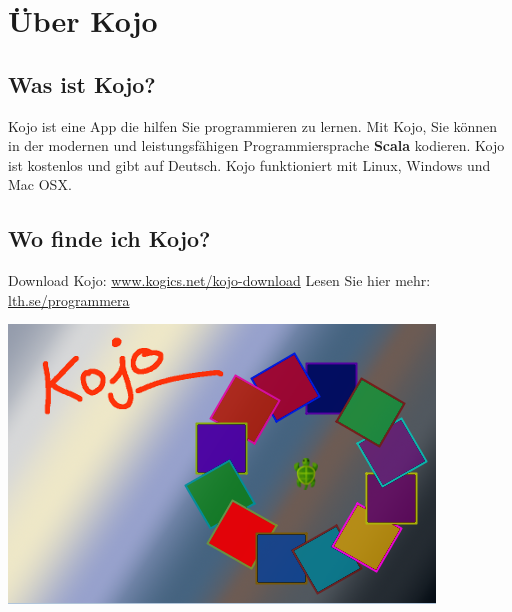 \chapter{Über Kojo}
\begin{multicols}{2}
\section*{\color{black}Was ist Kojo?}
Kojo ist eine App die hilfen Sie programmieren zu lernen. Mit Kojo, Sie können in der modernen und leistungsfähigen Programmiersprache {\bf\color{blue}Scala} kodieren. Kojo ist kostenlos und gibt auf Deutsch. Kojo funktioniert mit Linux, Windows und Mac OSX.
\section*{\color{black}Wo finde ich Kojo?}
Download Kojo: 
\href{http://www.kogics.net/kojo-download}{www.kogics.net/kojo-download}
Lesen Sie hier mehr: 
\href{http://lth.se/programmera}{lth.se/programmera}

\columnbreak

\begin{center}
\includegraphics{../img/kojo.png}
\end{center}

\end{multicols}

